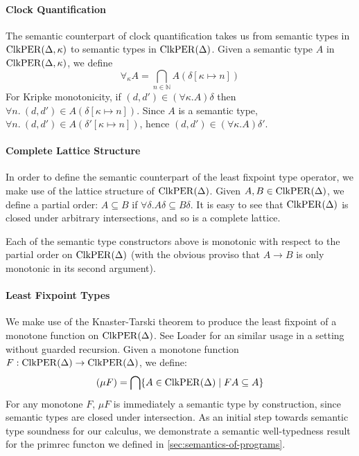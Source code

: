 \paragraph{Clock Quantification}
The semantic counterpart of clock quantification takes us from
semantic types in $\mathrm{ClkPER}(\Delta, \kappa)$ to semantic types in
$\mathrm{ClkPER}(\Delta)$. Given a semantic type $A$ in $\mathrm{ClkPER}(\Delta,
\kappa)$, we define
\begin{displaymath}
  \forall_\kappa A = \bigcap_{n \in \mathbb{N}} A(\delta[\kappa \mapsto n])
\end{displaymath}
For Kripke monotonicity, if $(d,d') \in
(\forall\kappa. A)\delta$ then $\forall n.\ (d,d') \in A(\delta[\kappa
\mapsto n])$. Since $A$ is a semantic type, $\forall n.\ (d,d') \in
A(\delta'[\kappa \mapsto n])$, hence $(d,d') \in
(\forall\kappa. A)\delta'$.

\paragraph{Complete Lattice Structure} In order to define the semantic
counterpart of the least fixpoint type operator, we make use of the
lattice structure of $\mathrm{ClkPER}(\Delta)$. Given $A, B \in
\mathrm{ClkPER}(\Delta)$, we define a partial order: $A \subseteq B$ if
$\forall \delta. A\delta \subseteq B\delta$. It is easy to see that
$\mathrm{ClkPER}(\Delta)$ is closed under arbitrary intersections, and so is a
complete lattice.

Each of the semantic type constructors above is monotonic with respect
to the partial order on $\mathrm{ClkPER}(\Delta)$ (with the obvious proviso
that $A \to B$ is only monotonic in its second argument).

\paragraph{Least Fixpoint Types}
We make use of the Knaster-Tarski theorem \cite{tarski55lattice} to
produce the least fixpoint of a monotone function on
$\mathrm{ClkPER}(\Delta)$. See Loader \cite{loader97equational} for an similar
usage in a setting without guarded recursion. Given a monotone
function $F : \mathrm{ClkPER}(\Delta) \to \mathrm{ClkPER}(\Delta)$, we define:
\begin{displaymath}
  (\mu F) = \bigcap \{ A \in \mathrm{ClkPER}(\Delta) \mathrel| FA \subseteq A \}
\end{displaymath}
For any monotone $F$, $\mu F$ is immediately a semantic type by
construction, since semantic types are closed under intersection. As
an initial step towards semantic type soundness for our calculus, we
demonstrate a semantic well-typedness result for the
$\mathrm{primrec}$ functon we defined in
\autoref{sec:semantics-of-programs}.

